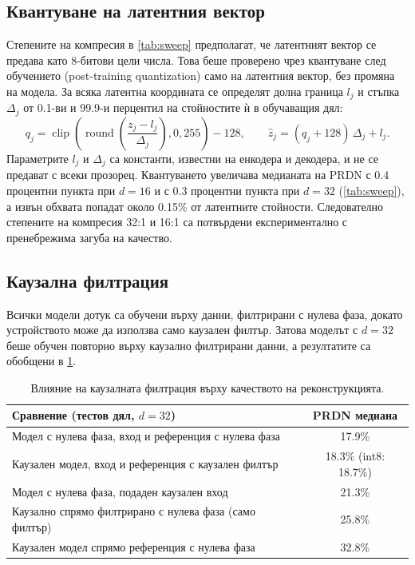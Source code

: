 \documentclass[12pt,a4paper]{article}
\begin{document}
\subsection{Квантуване на латентния вектор}
Степените на компресия в \cref{tab:sweep} предполагат, че латентният вектор се предава като 8-битови цели числа. Това беше проверено чрез квантуване след обучението (post-training quantization) само на латентния вектор, без промяна на модела. За всяка латентна координата се определят долна граница \(l_j\) и стъпка \(\Delta_j\) от 0.1-ви и 99.9-и перцентил на стойностите ѝ в обучаващия дял:
\begin{equation}
    q_j = \operatorname{clip}\!\left(\operatorname{round}\!\left(\frac{z_j - l_j}{\Delta_j}\right), 0, 255\right) - 128,
    \qquad
    \hat{z}_j = (q_j + 128)\,\Delta_j + l_j .
    \label{eq:quant}
\end{equation}
Параметрите \(l_j\) и \(\Delta_j\) са константи, известни на енкодера и декодера, и не се предават с всеки прозорец. Квантуването увеличава медианата на PRDN с 0.4 процентни пункта при \(d = 16\) и с 0.3 процентни пункта при \(d = 32\) (\cref{tab:sweep}), а извън обхвата попадат около 0.15\% от латентните стойности. Следователно степените на компресия 32:1 и 16:1 са потвърдени експериментално с пренебрежима загуба на качество.

\subsection{Каузална филтрация}
\label{sec:causal}
Всички модели дотук са обучени върху данни, филтрирани с нулева фаза, докато устройството може да използва само каузален филтър. Затова моделът с \(d = 32\) беше обучен повторно върху каузално филтрирани данни, а резултатите са обобщени в \cref{tab:causal}.

\begin{table}[htbp]
    \centering
    \begin{tabular}{l c}
        \toprule
        Сравнение (тестов дял, \(d = 32\)) & PRDN медиана \\
        \midrule
        Модел с нулева фаза, вход и референция с нулева фаза & 17.9\% \\
        Каузален модел, вход и референция с каузален филтър & 18.3\% (int8: 18.7\%) \\
        Модел с нулева фаза, подаден каузален вход & 21.3\% \\
        Каузално спрямо филтрирано с нулева фаза (само филтър) & 25.8\% \\
        Каузален модел спрямо референция с нулева фаза & 32.8\% \\
        \bottomrule
    \end{tabular}
    \caption{Влияние на каузалната филтрация върху качеството на реконструкцията.}
    \label{tab:causal}
\end{table}
\end{document}
